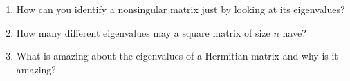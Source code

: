 \begin{enumerate}
%
\item How can you identify a nonsingular matrix just by looking at its eigenvalues?
%
\item How many different eigenvalues may a square matrix of size $n$ have?
%
\item What is amazing about the eigenvalues of a Hermitian matrix and why is it amazing?
%
\end{enumerate}